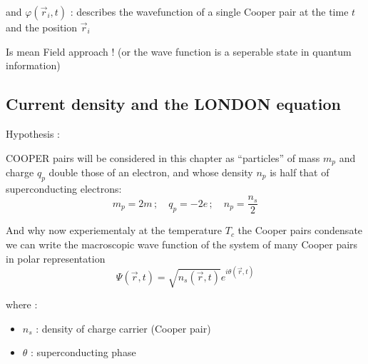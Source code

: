 and $\varphi(\vec{r}_i,t)$ : describes the wavefunction of 
a single Cooper pair at the time $t$ and the position $\vec{r}_i$


Is mean Field approach ! (or the wave function
is a seperable state in quantum information)







\newpage

\subsection{Current density and the LONDON equation}
Hypothesis :

COOPER pairs will be considered in this chapter as ``particles'' of mass $m_p$ and charge $q_p$ double those of an electron, and whose density $n_p$ is half that of superconducting electrons:
\[
m_p = 2m \, ; \quad q_p = -2e \, ; \quad n_p = \frac{n_s}{2}
\]


And why now experiementaly at
the temperature $T_c$ the Cooper pairs condensate 
we can write the macroscopic wave function of the system of 
many Cooper pairs in polar representation
\begin{equation*}
    \Psi (\vec{r}, t) = \sqrt{n_s(\vec{r}, t)} e^{i \theta (\vec{r}, t)}
\end{equation*}


where :
\begin{itemize}
    \item $n_s$ : density of charge carrier (Cooper pair)
    \item $\theta$ : superconducting phase
\end{itemize}

